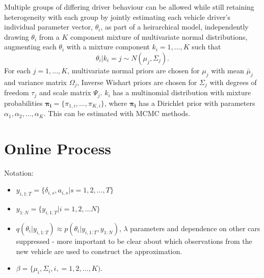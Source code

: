 \documentclass[12pt,a4paper]{article}\usepackage[]{graphicx}\usepackage[]{color}
\begin{document}
Multiple groups of differing driver behaviour can be allowed while still retaining heterogeneity with each group by jointly estimating each vehicle driver's individual parameter vector, $\theta_i$, as part of a heirarchical model, independently drawing $\theta_i$ from a $K$ component mixture of multivariate normal distributions, augmenting each $\theta_i$ with a mixture component $k_i = 1, \dots, K$ such that 
\begin{equation}
\theta_i | k_i = j \sim N(\mu_j, \Sigma_j).
\end{equation}
For each $j = 1, \dots, K$, multivariate normal priors are chosen for $\mu_j$ with mean $\bar{\mu}_j$ and variance matrix $\Omega_j$, Inverse Wishart priors are chosen for $\Sigma_j$ with degrees of freedom $\tau_j$ and scale matrix $\Psi_j$. $k_{i}$ has a multinomial distribution with mixture probabilities $\boldsymbol{\pi_i} = \{\pi_{1, i}, \dots, \pi_{K, i}\}$, where $\boldsymbol{\pi_i}$ has a Dirichlet prior with parameters $\alpha_1, \alpha_2, \dots, \alpha_K$. This can be estimated with MCMC methods.

\section{Online Process}

Notation:
\begin{itemize}
\item $y_{i, 1:T} = \{\delta_{i, s}, a_{i, s} | s = 1, 2, \dots, T\}$ 
\item $y_{1:N} = \{y_{i, 1:T} | i = 1, 2, \dots N\}$
\item $q(\theta_i | y_{i, 1:T}) \approx p(\theta_i | y_{i, 1:T}, y_{1:N})$, $\lambda$ parameters and dependence on other cars suppressed - more important to be clear about which observations from the new vehicle are used to construct the approximation.
\item $\beta = \{\mu_i, \Sigma_i, i, = 1, 2, \dots, K)$.
\end{itemize}
\end{document}
